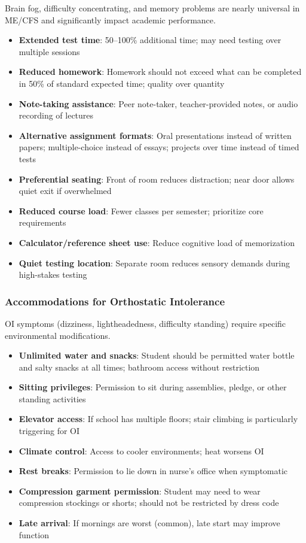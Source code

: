 Brain fog, difficulty concentrating, and memory problems are nearly universal in ME/CFS and significantly impact academic performance.

\begin{itemize}
    \item \textbf{Extended test time}: 50--100\% additional time; may need testing over multiple sessions
    \item \textbf{Reduced homework}: Homework should not exceed what can be completed in 50\% of standard expected time; quality over quantity
    \item \textbf{Note-taking assistance}: Peer note-taker, teacher-provided notes, or audio recording of lectures
    \item \textbf{Alternative assignment formats}: Oral presentations instead of written papers; multiple-choice instead of essays; projects over time instead of timed tests
    \item \textbf{Preferential seating}: Front of room reduces distraction; near door allows quiet exit if overwhelmed
    \item \textbf{Reduced course load}: Fewer classes per semester; prioritize core requirements
    \item \textbf{Calculator/reference sheet use}: Reduce cognitive load of memorization
    \item \textbf{Quiet testing location}: Separate room reduces sensory demands during high-stakes testing
\end{itemize}

\subsubsection{Accommodations for Orthostatic Intolerance}

OI symptoms (dizziness, lightheadedness, difficulty standing) require specific environmental modifications.

\begin{itemize}
    \item \textbf{Unlimited water and snacks}: Student should be permitted water bottle and salty snacks at all times; bathroom access without restriction
    \item \textbf{Sitting privileges}: Permission to sit during assemblies, pledge, or other standing activities
    \item \textbf{Elevator access}: If school has multiple floors; stair climbing is particularly triggering for OI
    \item \textbf{Climate control}: Access to cooler environments; heat worsens OI
    \item \textbf{Rest breaks}: Permission to lie down in nurse's office when symptomatic
    \item \textbf{Compression garment permission}: Student may need to wear compression stockings or shorts; should not be restricted by dress code
    \item \textbf{Late arrival}: If mornings are worst (common), late start may improve function
\end{itemize}

